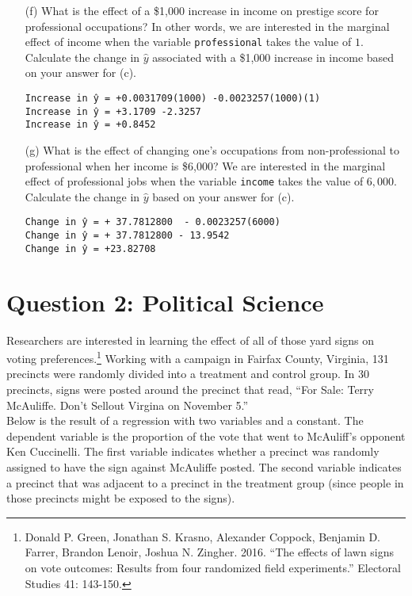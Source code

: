 \documentclass[12pt,letterpaper]{article}
\begin{document}
\begin{enumerate}
	\newpage
	\item [(f)]
	What is the effect of a \$1,000 increase in income on prestige score for professional occupations? In other words, we are interested in the marginal effect of income when the variable \texttt{professional} takes the value of $1$. Calculate the change in $\hat{y}$ associated with a \$1,000 increase in income based on your answer for (c).
	
\begin{verbatim}
Increase in ŷ = +0.0031709(1000) -0.0023257(1000)(1)
Increase in ŷ = +3.1709 -2.3257
Increase in ŷ = +0.8452
\end{verbatim}

	\vspace{10cm}
	
	
	\item [(g)]
	What is the effect of changing one's occupations from non-professional to professional when her income is \$6,000? We are interested in the marginal effect of professional jobs when the variable \texttt{income} takes the value of $6,000$. Calculate the change in $\hat{y}$ based on your answer for (c).
	
\begin{verbatim}
Change in ŷ = + 37.7812800  - 0.0023257(6000)
Change in ŷ = + 37.7812800 - 13.9542
Change in ŷ = +23.82708
\end{verbatim}
	

\end{enumerate}

\newpage

\section*{Question 2: Political Science}
\vspace{.25cm}
\noindent 	Researchers are interested in learning the effect of all of those yard signs on voting preferences.\footnote{Donald P. Green, Jonathan	S. Krasno, Alexander Coppock, Benjamin D. Farrer,	Brandon Lenoir, Joshua N. Zingher. 2016. ``The effects of lawn signs on vote outcomes: Results from four randomized field experiments.'' Electoral Studies 41: 143-150. } Working with a campaign in Fairfax County, Virginia, 131 precincts were randomly divided into a treatment and control group. In 30 precincts, signs were posted around the precinct that read, ``For Sale: Terry McAuliffe. Don't Sellout Virgina on November 5.'' \\

Below is the result of a regression with two variables and a constant.  The dependent variable is the proportion of the vote that went to McAuliff's opponent Ken Cuccinelli. The first variable indicates whether a precinct was randomly assigned to have the sign against McAuliffe posted. The second variable indicates
a precinct that was adjacent to a precinct in the treatment group (since people in those precincts might be exposed to the signs).  \\
\end{document}
